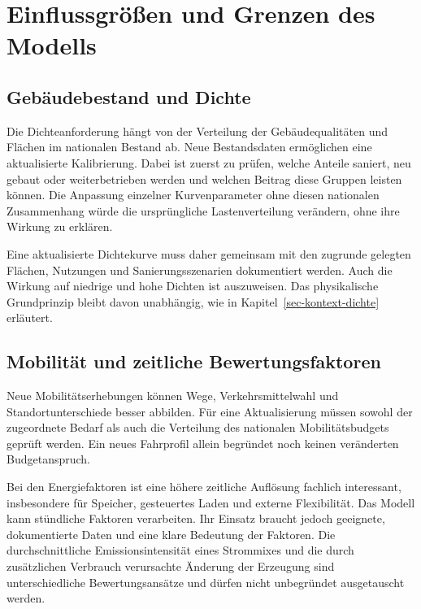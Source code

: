 \documentclass[
  ngerman,
  a4paper,
  DIV=11]{scrreprt}
\begin{document}
\section{Einflussgrößen und Grenzen des
Modells}\label{einflussgruxf6uxdfen-und-grenzen-des-modells}

\subsection{Gebäudebestand und
Dichte}\label{gebuxe4udebestand-und-dichte}

Die Dichteanforderung hängt von der Verteilung der Gebäudequalitäten und
Flächen im nationalen Bestand ab. Neue Bestandsdaten ermöglichen eine
aktualisierte Kalibrierung. Dabei ist zuerst zu prüfen, welche Anteile
saniert, neu gebaut oder weiterbetrieben werden und welchen Beitrag
diese Gruppen leisten können. Die Anpassung einzelner Kurvenparameter
ohne diesen nationalen Zusammenhang würde die ursprüngliche
Lastenverteilung verändern, ohne ihre Wirkung zu erklären.

Eine aktualisierte Dichtekurve muss daher gemeinsam mit den zugrunde
gelegten Flächen, Nutzungen und Sanierungsszenarien dokumentiert werden.
Auch die Wirkung auf niedrige und hohe Dichten ist auszuweisen. Das
physikalische Grundprinzip bleibt davon unabhängig, wie in
Kapitel~\ref{sec-kontext-dichte} erläutert.

\subsection{Mobilität und zeitliche
Bewertungsfaktoren}\label{mobilituxe4t-und-zeitliche-bewertungsfaktoren}

Neue Mobilitätserhebungen können Wege, Verkehrsmittelwahl und
Standortunterschiede besser abbilden. Für eine Aktualisierung müssen
sowohl der zugeordnete Bedarf als auch die Verteilung des nationalen
Mobilitätsbudgets geprüft werden. Ein neues Fahrprofil allein begründet
noch keinen veränderten Budgetanspruch.

Bei den Energiefaktoren ist eine höhere zeitliche Auflösung fachlich
interessant, insbesondere für Speicher, gesteuertes Laden und externe
Flexibilität. Das Modell kann stündliche Faktoren verarbeiten. Ihr
Einsatz braucht jedoch geeignete, dokumentierte Daten und eine klare
Bedeutung der Faktoren. Die durchschnittliche Emissionsintensität eines
Strommixes und die durch zusätzlichen Verbrauch verursachte Änderung der
Erzeugung sind unterschiedliche Bewertungsansätze und dürfen nicht
unbegründet ausgetauscht werden.
\end{document}
